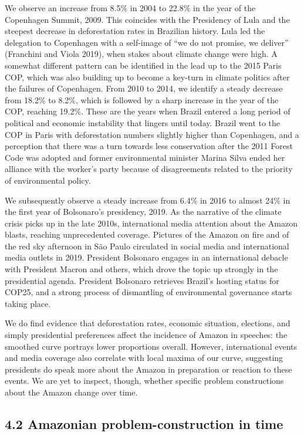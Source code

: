 \documentclass[
]{article}
\begin{document}
We observe an increase from 8.5\% in 2004 to 22.8\% in the year of the
Copenhagen Summit, 2009. This coincides with the Presidency of Lula and
the steepest decrease in deforestation rates in Brazilian history. Lula
led the delegation to Copenhagen with a self-image of ``we do not
promise, we deliver'' (Franchini and Viola 2019), when stakes about
climate change were high. A somewhat different pattern can be identified
in the lead up to the 2015 Paris COP, which was also building up to
become a key-turn in climate politics after the failures of Copenhagen.
From 2010 to 2014, we identify a steady decrease from 18.2\% to 8.2\%,
which is followed by a sharp increase in the year of the COP, reaching
19.2\%. These are the years when Brazil entered a long period of
political and economic instability that lingers until today. Brazil went
to the COP in Paris with deforestation numbers slightly higher than
Copenhagen, and a perception that there was a turn towards less
conservation after the 2011 Forest Code was adopted and former
environmental minister Marina Silva ended her alliance with the worker's
party because of disagreements related to the priority of environmental
policy.

We subsequently observe a steady increase from 6.4\% in 2016 to almost
24\% in the first year of Bolsonaro's presidency, 2019. As the narrative
of the climate crisis picks up in the late 2010s, international media
attention about the Amazon blasts, reaching unprecedented coverage.
Pictures of the Amazon on fire and of the red sky afternoon in São Paulo
circulated in social media and international media outlets in 2019.
President Bolsonaro engages in an international debacle with President
Macron and others, which drove the topic up strongly in the presidential
agenda. President Bolsonaro retrieves Brazil's hosting status for COP25,
and a strong process of dismantling of environmental governance starts
taking place.

We do find evidence that deforestation rates, economic situation,
elections, and simply presidential preferences affect the incidence of
Amazon in speeches: the smoothed curve portrays lower proportions
overall. However, international events and media coverage also correlate
with local maxima of our curve, suggesting presidents do speak more
about the Amazon in preparation or reaction to these events. We are yet
to inspect, though, whether specific problem constructions about the
Amazon change over time.

\hypertarget{amazonian-problem-construction-in-time}{%
\subsection{4.2 Amazonian problem-construction in
time}\label{amazonian-problem-construction-in-time}}
\end{document}
